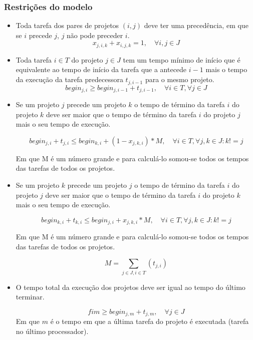 \documentclass[11pt,letterpaper]{article}
\begin{document}
\subsubsection*{Restrições do modelo}
\begin{itemize}
\item Toda tarefa dos pares de projetos $(i,j)$ deve ter uma precedência, em que se $i$
  precede $j$, $j$ não pode preceder $i$. 
  \begin{equation*}
    x_{j,i,k}+x_{i,j,k}=1, \quad \forall i,j \in J
  \end{equation*}

\item Toda tarefa $i \in T$ do projeto  $j \in J$ tem um tempo mínimo de início que é equivalente ao tempo de início da tarefa que a antecede $i -1$ mais o tempo da execução da tarefa predecessora $ t_{j,i-1}$ para o mesmo projeto. 
  \begin{equation*}
    begin_{j,i} \geq begin_{j,i-1}+ t_{j,i-1}, \quad\forall i \in T, \forall j \in J
  \end{equation*}

\item Se um projeto $j$ precede um projeto $k$ o tempo de término da
  tarefa $i$ do projeto $k$ deve ser maior que o tempo de término da
  tarefa $i$ do projeto $j$ mais o seu tempo de execução.
  
  \begin{equation*}
    begin_{j,i} + t_{j,i} \leq begin_{k,i}+(1-x_{j,k,i})*M,\quad \forall i \in T, \forall j,k \in J  : k!=j 
  \end{equation*}


  Em que M é um número grande e para calculá-lo somou-se todos os tempos
  das tarefas de todos os projetos. 

\item  Se um projeto $k$ precede um projeto $j$ o tempo de término da
  tarefa $i$ do projeto $j$ deve ser maior que o tempo de término da
  tarefa $i$ do projeto $k$ mais o seu tempo de execução.
  
  \begin{equation*}
    begin_{k,i} + t_{k,i} \leq begin_{j,i}+x_{j,k,i}*M,\quad \forall i \in T , \forall j,k \in J : k!=j 
  \end{equation*}

  Em que M é um número grande e para calculá-lo somou-se todos os tempos
  das tarefas de todos os projetos. 


  \begin{equation*}
    M = \sum_{j \in J,i \in T} (t_{j,i}) 
  \end{equation*}

\item O tempo total da execução dos projetos deve ser igual ao tempo
  do último terminar.
  
  \begin{equation*}
    fim \geq begin_{j,m}+ t_{j,m},\quad \forall j \in J
  \end{equation*}
  Em que $m$ é o tempo em que a última tarefa do projeto é executada
  (tarefa no último processador).
\end{itemize}
\end{document}
